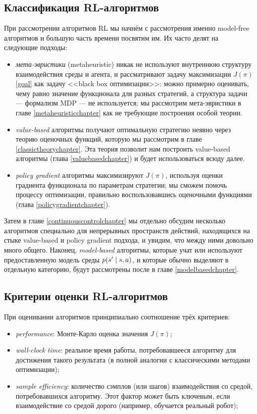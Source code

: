 \subsection{Классификация RL-алгоритмов}

При рассмотрении алгоритмов RL мы начнём с рассмотрения именно model-free алгоритмов и большую часть времени посвятим им. Их часто делят на следующие подходы:
\begin{itemize}
    \item \emph{мета-эвристики} (metaheuristic) никак не используют внутреннюю структуру взаимодействия среды и агента, и рассматривают задачу максимизации $J(\pi)$ \eqref{goal} как задачу <<black box оптимизации>>: можно примерно оценивать, чему равно значение функционала для разных стратегий, а структура задачи --- формализм MDP --- не используется; мы рассмотрим мета-эвристики в главе \ref{metaheuristicchapter} как не требующие построения особой теории. 
    \item \emph{value-based} алгоритмы получают оптимальную стратегию неявно через теорию оценочных функций, которую мы рассмотрим в главе \ref{classictheorychapter}. Эта теория позволит нам построить value-based алгоритмы (глава \ref{valuebasedchapter}) и будет использоваться всюду далее.
    \item \emph{policy gradient} алгоритмы максимизируют $J(\pi)$, используя оценки градиента функционала по параметрам стратегии; мы сможем помочь процессу оптимизации, правильно воспользовавшись оценочными функциями (глава \ref{policygradientchapter}).
\end{itemize}

Затем в главе \ref{continuouscontrolchapter} мы отдельно обсудим несколько алгоритмов специально для непрерывных пространств действий, находящихся на стыке value-based и policy gradient подхода, и увидим, что между ними довольно много общего. Наконец, \emph{model-based} алгоритмы, которые учат или используют предоставленную модель среды $p(s' \HM\mid s, a)$, и которые обычно выделяют в отдельную категорию, будут рассмотрены после в главе \ref{modelbasedchapter}.

\subsection{Критерии оценки RL-алгоритмов}

При оценивании алгоритмов принципиально соотношение трёх критериев:
\begin{itemize}
    \item \emph{performance}: Монте-Карло оценка значения $J(\pi)$;
    \item \emph{wall-clock time}: реальное время работы, потребовавшееся алгоритму для достижения такого результата (в полной аналогии с классическими методами оптимизации);
    \item \emph{sample efficiency}: количество сэмплов (или шагов) взаимодействия со средой, потребовавшихся алгоритму. Этот фактор может быть ключевым, если взаимодействие со средой дорого (например, обучается реальный робот); 
\end{itemize}

